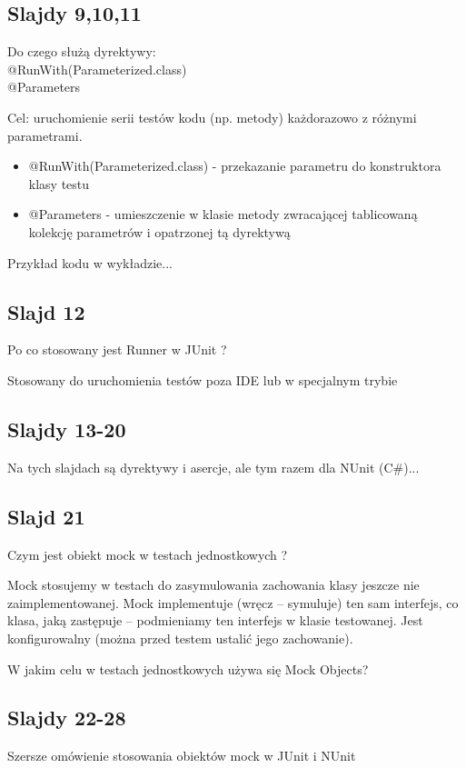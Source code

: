 \documentclass[a4paper,15pt]{article}
\newcommand{\question}[2]{
    \begin{tcolorbox}[colback=mRed!5!white,colframe=mRed,title={Kolokwium 2018 #1}]
        #2
    \end{tcolorbox}
}
\begin{document}
\subsection{Slajdy 9,10,11}
\begin{framed}
Do czego służą dyrektywy:  \\
@RunWith(Parameterized.class) \\
@Parameters
\end{framed}
Cel: uruchomienie serii testów kodu (np. metody) każdorazowo z różnymi parametrami.
\begin{itemize}
\item @RunWith(Parameterized.class) - przekazanie parametru do konstruktora klasy testu
\item @Parameters - umieszczenie w klasie metody zwracającej tablicowaną kolekcję parametrów i opatrzonej tą dyrektywą
\end{itemize}

Przykład kodu w wykładzie...

\subsection{Slajd 12}
\begin{framed}
Po co stosowany jest Runner w JUnit ?
\end{framed}
Stosowany do uruchomienia testów poza IDE lub w specjalnym trybie

\subsection{Slajdy 13-20}
Na tych slajdach są dyrektywy i asercje, ale tym razem dla NUnit (C\#)...

\subsection{Slajd 21}
\begin{framed}
Czym jest obiekt mock w testach jednostkowych ?
\end{framed}
Mock stosujemy w testach do zasymulowania zachowania klasy jeszcze nie zaimplementowanej. Mock implementuje (wręcz – symuluje) ten sam interfejs, co klasa, jaką zastępuje – podmieniamy ten interfejs w klasie testowanej. Jest konfigurowalny (można przed testem ustalić jego zachowanie).

\question{}{
W jakim celu w testach jednostkowych używa się Mock Objects?
}

\subsection{Slajdy 22-28}
Szersze omówienie stosowania obiektów mock w JUnit i NUnit
\end{document}
